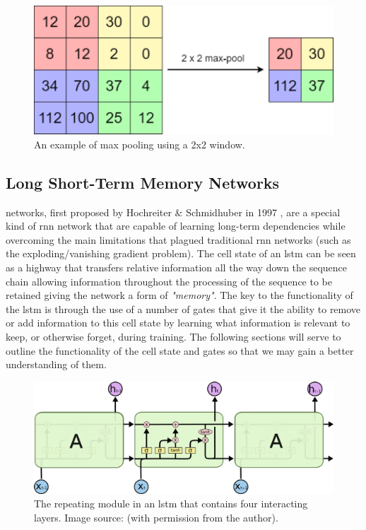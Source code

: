 \begin{figure}[hbt!]
    \centering
    \includegraphics[width=\textwidth]{Images/Chapter 3/CNN/Max-Pooling-Illustration.pdf}
    \caption{An example of max pooling using a 2x2 window.}
    \label{fig:Max-Pooling-Illustration}
\end{figure}

\clearpage

\subsection{Long Short-Term Memory Networks}
\label{subsec:Background-Information:Forecasting-Models:Long-Short-Term-Memory-Networks}
 networks, first proposed by Hochreiter \& Schmidhuber in 1997 \cite{Hochreiter}, are a special kind of \gls{rnn} network that are capable of learning long-term dependencies while overcoming the main limitations that plagued traditional \gls{rnn} networks (such as the exploding/vanishing gradient problem). The cell state of an \gls{lstm} can be seen as a highway that transfers relative information all the way down the sequence chain allowing information throughout the processing of the sequence to be retained giving the network a form of \textit{"memory"}. The key to the functionality of the \gls{lstm} is through the use of a number of gates that give it the ability to remove or add information to this cell state by learning what information is relevant to keep, or otherwise forget, during training. The following sections will serve to outline the functionality of the cell state and gates so that we may gain a better understanding of them.

\begin{figure}[hbt!]
    \centering
    \includegraphics[width=\textwidth]{Images/Chapter 3/LSTM/LSTM-Chain-Illustration.pdf}
    \caption{The repeating module in an \gls{lstm} that contains four interacting layers. Image source: \cite{Colah}  (with permission from the author).}
    \label{fig:LSTM-Chain-Illustration}
\end{figure}

